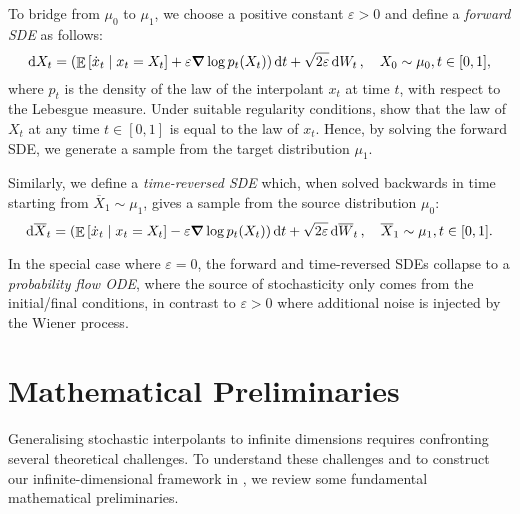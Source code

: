 To bridge from \(\mu_{0}\) to \(\mu_{1}\), we choose a positive constant \(\varepsilon > 0\) and define a \textit{forward SDE} as follows:
\[
  \dd{X_{t}} = \qty(\mathop{\mathbb{E}}\qty[\dot{x}_{t} \mid x_{t} = X_{t}] + \varepsilon \grad \log p_{t}(X_{t}))\dd{t} + \sqrt{2\varepsilon} \dd{W_{t}}, \quad X_{0} \sim \mu_{0}, t \in [0, 1],
\]
where \(p_{t}\) is the density of the law of the interpolant \(x_{t}\) at time \(t\), with respect to the Lebesgue measure. Under suitable regularity conditions, \citet{albergo2023stochasticinterpolantsunifyingframework} show that the law of \(X_{t}\) at any time \(t \in [0, 1]\) is equal to the law of \(x_{t}\). Hence, by solving the forward SDE, we generate a sample from the target distribution \(\mu_{1}\). %

Similarly, we define a \textit{time-reversed SDE} which, when solved backwards in time starting from \(\overline{X}_{1} \sim \mu_{1}\), gives a sample from the source distribution \(\mu_{0}\):
\[
  \dd{ \overline{X}_{t}} = \qty(\mathop{\mathbb{E}}\qty[\dot{x}_{t} \mid x_{t} = X_{t}] - \varepsilon \grad \log p_{t}(X_{t}))\dd{t} + \sqrt{2\varepsilon} \dd{ \overline{W}_{t}}, \quad \overline{X}_{1} \sim \mu_{1}, t \in [0, 1].
\]

In the special case where \(\varepsilon = 0\), the forward and time-reversed SDEs collapse to a \textit{probability flow ODE}, where the source of stochasticity only comes from the initial/final conditions, in contrast to \(\varepsilon > 0\) where additional noise is injected by the Wiener process. %





\section{Mathematical Preliminaries}
Generalising stochastic interpolants to infinite dimensions requires confronting several theoretical challenges. To understand these challenges and to construct our infinite-dimensional framework in , we review some fundamental mathematical preliminaries.

